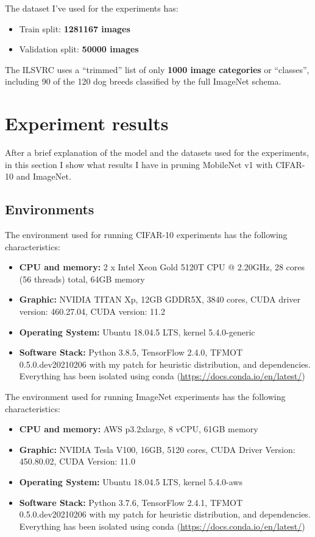 The dataset I've used for the experiments has:

\begin{itemize}
    \item Train split: \textbf{1281167 images}
    \item Validation split: \textbf{50000 images}
\end{itemize}

The ILSVRC uses a ``trimmed'' list of only \textbf{1000 image categories} or
``classes'', including 90 of the 120 dog breeds classified by the full ImageNet
schema.

\section{Experiment results}
After a brief explanation of the model and the datasets used for the
experiments, in this section I show what results I have in pruning MobileNet v1
with CIFAR-10 and ImageNet.

\subsection{Environments}
The environment used for running CIFAR-10 experiments has the following
characteristics:

\begin{itemize}
    \item \textbf{CPU and memory:} 2 x Intel Xeon Gold 5120T CPU @ 2.20GHz, 28
        cores (56 threads) total, 64GB memory
    \item \textbf{Graphic:} NVIDIA TITAN Xp, 12GB GDDR5X, 3840 cores, CUDA
        driver version: 460.27.04, CUDA version: 11.2
    \item \textbf{Operating System:} Ubuntu 18.04.5 LTS, kernel
        5.4.0-generic
    \item \textbf{Software Stack:} Python 3.8.5, TensorFlow 2.4.0, TFMOT
        0.5.0.dev20210206 with my patch for heuristic distribution, and
        dependencies. Everything has been isolated using conda
        (\url{https://docs.conda.io/en/latest/})
\end{itemize}

The environment used for running ImageNet experiments has the following
characteristics:

\begin{itemize}
    \item \textbf{CPU and memory:} AWS p3.2xlarge, 8 vCPU, 61GB memory
    \item \textbf{Graphic:} NVIDIA Tesla V100, 16GB, 5120 cores, CUDA Driver
        Version: 450.80.02, CUDA Version: 11.0
    \item \textbf{Operating System:} Ubuntu 18.04.5 LTS, kernel
        5.4.0-aws
    \item \textbf{Software Stack:} Python 3.7.6, TensorFlow 2.4.1, TFMOT
        0.5.0.dev20210206 with my patch for heuristic distribution, and
        dependencies. Everything has been isolated using conda
        (\url{https://docs.conda.io/en/latest/})
\end{itemize}

